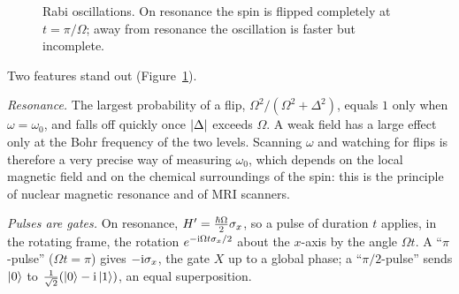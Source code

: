 \begin{figure}[htb]
  \centering
  \caption{Rabi oscillations. On resonance the spin is flipped completely at $t=\pi/\Omega$; away from resonance the oscillation is faster but incomplete.}
  \label{fig:rabi}
\end{figure}

Two features stand out (Figure~\ref{fig:rabi}).
\begin{steps}
  \item \emph{Resonance.} The largest probability of a flip, $\Omega^2/(\Omega^2+\Delta^2)$, equals $1$ only when $\omega=\omega_0$, and falls off quickly once $\left|\Delta\right|$ exceeds $\Omega$. A weak field has a large effect only at the Bohr frequency of the two levels. Scanning $\omega$ and watching for flips is therefore a very precise way of measuring $\omega_0$, which depends on the local magnetic field and on the chemical surroundings of the spin: this is the principle of nuclear magnetic resonance and of MRI scanners.
  \item \emph{Pulses are gates.} On resonance, $H'=\tfrac{\hbar\Omega}2\sigma_x$, so a pulse of duration $t$ applies, in the rotating frame, the rotation $e^{-\mathrm{i}\Omega t\sigma_x/2}$ about the $x$-axis by the angle $\Omega t$. A ``$\pi$-pulse'' ($\Omega t=\pi$) gives $-\mathrm{i}\sigma_x$, the gate $X$ up to a global phase; a ``$\pi/2$-pulse'' sends $\left|0\right\rangle$ to $\tfrac1{\sqrt2}(\left|0\right\rangle-\mathrm{i}\left|1\right\rangle)$, an equal superposition.
\end{steps}

